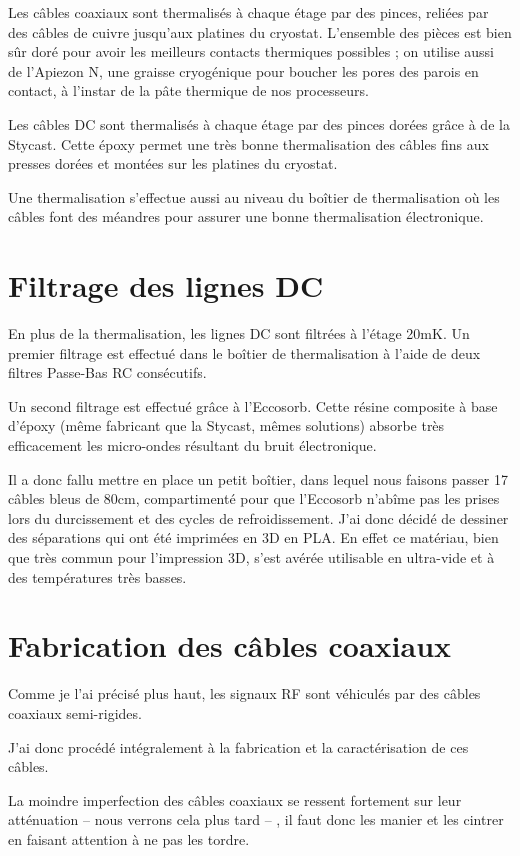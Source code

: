 \documentclass[a4paper,11pt]{report}
\begin{document}
Les câbles coaxiaux sont thermalisés à chaque étage par des pinces, reliées par des câbles de cuivre jusqu'aux platines du cryostat. L'ensemble des pièces est bien sûr doré pour avoir les meilleurs contacts thermiques possibles ; on utilise aussi de l'Apiezon N, une graisse cryogénique pour boucher les pores des parois en contact, à l'instar de la pâte thermique de nos processeurs.
\newline

Les câbles DC sont thermalisés à chaque étage par des pinces dorées grâce à de la Stycast. Cette époxy permet une très bonne thermalisation des câbles fins aux presses dorées et montées sur les platines du cryostat.

Une thermalisation s'effectue aussi au niveau du boîtier de thermalisation où les câbles font des méandres pour assurer une bonne thermalisation électronique.

\section{Filtrage des lignes DC}
En plus de la thermalisation, les lignes DC sont filtrées à l'étage 20mK. Un premier filtrage est effectué dans le boîtier de thermalisation à l'aide de deux filtres Passe-Bas RC consécutifs.

Un second filtrage est effectué grâce à l'Eccosorb. Cette résine composite à base d'époxy (même fabricant que la Stycast, mêmes solutions) absorbe très efficacement les micro-ondes résultant du bruit électronique.

Il a donc fallu mettre en place un petit boîtier, dans lequel nous faisons passer 17 câbles bleus de 80cm, compartimenté pour que l'Eccosorb n'abîme pas les prises lors du durcissement et des cycles de refroidissement. J'ai donc décidé de dessiner des séparations qui ont été imprimées en 3D en PLA. En effet ce matériau, bien que très commun pour l'impression 3D, s'est avérée utilisable en ultra-vide et à des températures très basses.


\section{Fabrication des câbles coaxiaux}
Comme je l'ai précisé plus haut, les signaux RF sont véhiculés par des câbles coaxiaux semi-rigides.

J'ai donc procédé intégralement à la fabrication et la caractérisation de ces câbles.

La moindre imperfection des câbles coaxiaux se ressent fortement sur leur atténuation -- nous verrons cela plus tard -- , il faut donc les manier et les cintrer en faisant attention à ne pas les tordre.
\end{document}
